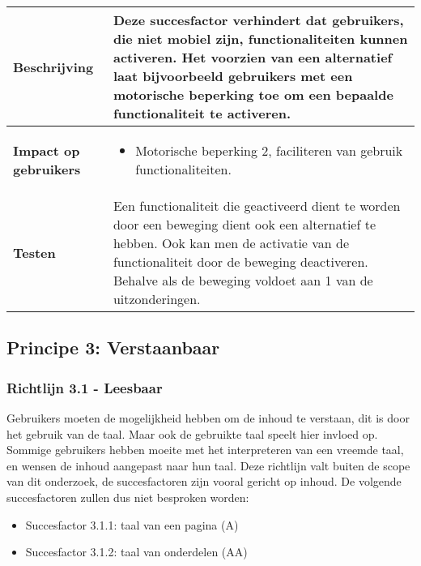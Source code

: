 \begin{table}[H]
\begin{tabular}{|l|p{12cm}|}
        \hline
        \textbf{Beschrijving}                 & Deze succesfactor verhindert dat gebruikers, die niet mobiel zijn, functionaliteiten kunnen activeren. Het voorzien van een alternatief laat bijvoorbeeld gebruikers met een motorische beperking toe om een bepaalde functionaliteit te activeren.   \\ 
        \hline
        \textbf{Impact op gebruikers}         &  
        \begin{itemize}
            \item Motorische beperking 2, faciliteren van gebruik functionaliteiten.
            
            
        \end{itemize}                                                                                                                                                                                                                                                                                                     \\ 
       
        \hline
        \textbf{Testen}                       & Een functionaliteit die geactiveerd dient te worden door een beweging dient ook een alternatief te hebben. Ook kan men de activatie van de functionaliteit door de beweging deactiveren.  Behalve als de beweging voldoet aan 1 van de uitzonderingen.                         \\
        \hline
    \end{tabular}
    
\end{table}
\subsection{Principe 3: Verstaanbaar}
\label{sec:verstaanbaarWCAG}

\subsubsection{Richtlijn 3.1 - Leesbaar}
Gebruikers moeten de mogelijkheid hebben om de inhoud te verstaan, dit is door het gebruik van de taal. Maar ook de gebruikte taal speelt hier invloed op. Sommige gebruikers hebben moeite met het interpreteren van een vreemde taal, en wensen de inhoud aangepast naar hun taal. Deze richtlijn valt buiten de scope van dit onderzoek, de succesfactoren zijn vooral gericht op inhoud. De volgende succesfactoren zullen dus niet besproken worden: \begin{itemize}
    \item Succesfactor 3.1.1: taal van een pagina (A)
    \item Succesfactor 3.1.2: taal van onderdelen (AA)
\end{itemize}
